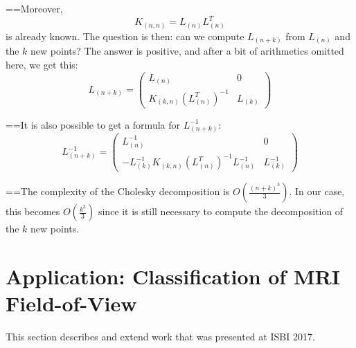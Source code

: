 ==Moreover,
\begin{equation}
	 K_{(n,n)} = L_{(n)} L_{(n)}^T
\end{equation}
is already known. The question is then: can we compute $L_{(n+k)}$ from $L_{(n)}$ and the $k$ new points? The answer is positive, and after a bit of arithmetics omitted here, we get this:
\begin{equation}
  L_{(n+k)} = 
  \begin{pmatrix}
    L_{(n)} & 0 \\
    K_{(k,n)} (L_{(n)}^T)^{-1} & L_{(k)}
  \end{pmatrix}
\end{equation}

==It is also possible to get a formula for $ L_{(n+k)}^{-1}$:
\begin{equation}
  L_{(n+k)}^{-1} =
  \begin{pmatrix}
    L_{(n)}^{-1} & 0 \\
    - L_{(k)}^{-1} K_{(k,n)} (L_{(n)}^T)^{-1} L_{(n)}^{-1} & L_{(k)}^{-1}
  \end{pmatrix}
\end{equation}

==The complexity of the Cholesky decomposition is $O\left(\frac{(n+k)^3}{3}\right)$. In our case, this becomes $O\left(\frac{k^3}{3}\right)$ since it is still necessary to compute the decomposition of the $k$ new points.

\section{Application: Classification of MRI Field-of-View}

This section describes and extend work that was presented at ISBI 2017.


